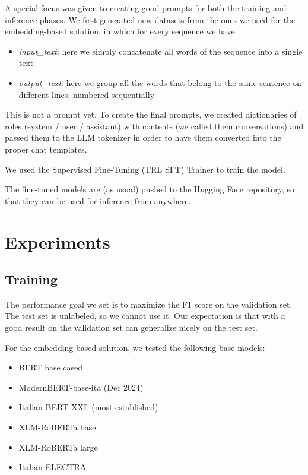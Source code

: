 \documentclass[11pt]{article}
\begin{document}
A special focus was given to creating good prompts for both the training and inference phases.
We first generated new datasets from the ones we used for the embedding-based solution, in which 
for every sequence we have:

 \begin{itemize}
 	\item \emph{input\_text}: here we simply concatenate all words of the sequence into a single text
 	\item \emph{output\_text}: here we group all the words that belong to the same sentence on different lines, numbered sequentially
 \end{itemize}
 
 This is not a prompt yet. To create the final prompts, we created dictionaries of roles (system / user / assistant) with contents (we called them conversations) and passed them to the LLM tokenizer in order to have them converted into the proper chat templates. 
 
 We used the Supervised Fine-Tuning (TRL SFT) Trainer to train the model.

The fine-tuned models are (as usual) pushed to the Hugging Face repository, so that they can be used for inference from anywhere.

\section{Experiments}

\subsection{Training}

The performance goal we set is to maximize the F1 score on the validation set. The test set is unlabeled, so we cannot use it. Our expectation is that with a good result on the
validation set can generalize nicely on the test set.

For the embedding-based solution, we tested the following base models:

 \begin{itemize}
 	\item BERT base cased
	\item ModernBERT-base-ita (Dec 2024)
	\item Italian BERT XXL (most established)
	\item XLM-RoBERTa base
	\item XLM-RoBERTa large
	\item Italian ELECTRA
\end{itemize}
\end{document}
